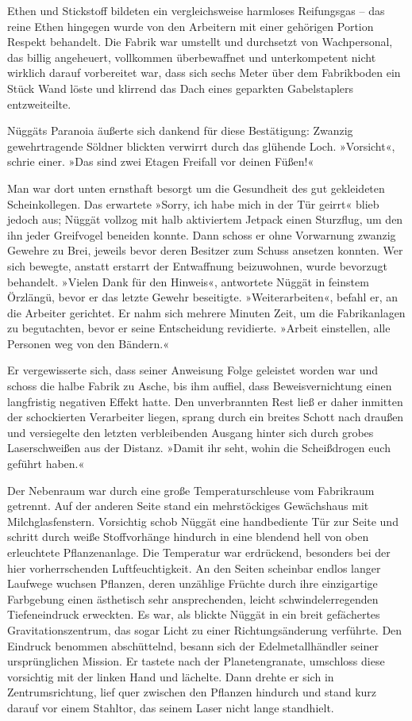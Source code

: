 Ethen und Stickstoff bildeten ein vergleichsweise harmloses Reifungsgas – das reine Ethen hingegen wurde von den Arbeitern mit einer gehörigen Portion Respekt behandelt. Die Fabrik war umstellt und durchsetzt von Wachpersonal, das billig angeheuert, vollkommen überbewaffnet und unterkompetent nicht wirklich darauf vorbereitet war, dass sich sechs Meter über dem Fabrikboden ein Stück Wand löste und klirrend das Dach eines geparkten Gabelstaplers entzweiteilte.

Nüggäts Paranoia äußerte sich dankend für diese Bestätigung: Zwanzig gewehrtragende Söldner blickten verwirrt durch das glühende Loch. »Vorsicht«, schrie einer. »Das sind zwei Etagen Freifall vor deinen Füßen!«

Man war dort unten ernsthaft besorgt um die Gesundheit des gut gekleideten Scheinkollegen. Das erwartete »Sorry, ich habe mich in der Tür geirrt« blieb jedoch aus; Nüggät vollzog mit halb aktiviertem Jetpack einen Sturzflug, um den ihn jeder Greifvogel beneiden konnte. Dann schoss er ohne Vorwarnung zwanzig Gewehre zu Brei, jeweils bevor deren Besitzer zum Schuss ansetzen konnten. Wer sich bewegte, anstatt erstarrt der Entwaffnung beizuwohnen, wurde bevorzugt behandelt. »Vielen Dank für den Hinweis«, antwortete Nüggät in feinstem Örzlängü, bevor er das letzte Gewehr beseitigte. »Weiterarbeiten«, befahl er, an die Arbeiter gerichtet. Er nahm sich mehrere Minuten Zeit, um die Fabrikanlagen zu begutachten, bevor er seine Entscheidung revidierte. »Arbeit einstellen, alle Personen weg von den Bändern.«

Er vergewisserte sich, dass seiner Anweisung Folge geleistet worden war und schoss die halbe Fabrik zu Asche, bis ihm auffiel, dass Beweisvernichtung einen langfristig negativen Effekt hatte. Den unverbrannten Rest ließ er daher inmitten der schockierten Verarbeiter liegen, sprang durch ein breites Schott nach draußen und versiegelte den letzten verbleibenden Ausgang hinter sich durch grobes Laserschweißen aus der Distanz. »Damit ihr seht, wohin die Scheißdrogen euch geführt haben.«

Der Nebenraum war durch eine große Temperaturschleuse vom Fabrikraum getrennt. Auf der anderen Seite stand ein mehrstöckiges Gewächshaus mit Milchglasfenstern. Vorsichtig schob Nüggät eine handbediente Tür zur Seite und schritt durch weiße Stoffvorhänge hindurch in eine blendend hell von oben erleuchtete Pflanzenanlage. Die Temperatur war erdrückend, besonders bei der hier vorherrschenden Luftfeuchtigkeit. An den Seiten scheinbar endlos langer Laufwege wuchsen Pflanzen, deren unzählige Früchte durch ihre einzigartige Farbgebung einen ästhetisch sehr ansprechenden, leicht schwindelerregenden Tiefeneindruck erweckten. Es war, als blickte Nüggät in ein breit gefächertes Gravitationszentrum, das sogar Licht zu einer Richtungsänderung verführte. Den Eindruck benommen abschüttelnd, besann sich der Edelmetallhändler seiner ursprünglichen Mission. Er tastete nach der Planetengranate, umschloss diese vorsichtig mit der linken Hand und lächelte. Dann drehte er sich in Zentrumsrichtung, lief quer zwischen den Pflanzen hindurch und stand kurz darauf vor einem Stahltor, das seinem Laser nicht lange standhielt.

